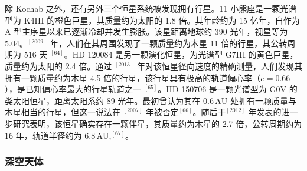 除 Kochab 之外，还有另外三个恒星系统被发现拥有行星。11 小熊座是一颗光谱型为 K4III 的橙色巨星，其质量约为太阳的 1.8 倍。其年龄约为 15 亿年，自作为 A 型主序星以来已逐渐冷却并发生膨胀。该星距离地球约 390 光年，视星等为 5.04。$^{[2009]}$ 年，人们在其周围发现了一颗质量约为木星 11 倍的行星，其公转周期为 516 天 $^{[64]}$。HD 120084 是另一颗演化恒星，为光谱型 G7III 的黄色巨星，质量约为太阳的 2.4 倍。通过 $^{[2013]}$ 年对该恒星径向速度的精确测量，人们发现其拥有一颗质量约为木星 4.5 倍的行星，该行星具有极高的轨道偏心率（$e=0.66$），是已知偏心率最大的行星轨道之一 $^{[65]}$。HD 150706 是一颗光谱型为 G0V 的类太阳恒星，距离太阳系约 89 光年。最初曾认为其在 $0.6\,\mathrm{AU}$ 处拥有一颗质量与木星相当的行星，但这一说法在 $^{[2007]}$ 年被否定$^{[66]}$。随后于$^{[2012]}$ 年发表的进一步研究表明，该恒星确实存在一颗伴星，其质量约为木星的 2.7 倍，公转周期约为 $16$ 年，轨道半径约为 $6.8\,\mathrm{AU}$,$^{[67]}$。
\subsubsection{深空天体}
